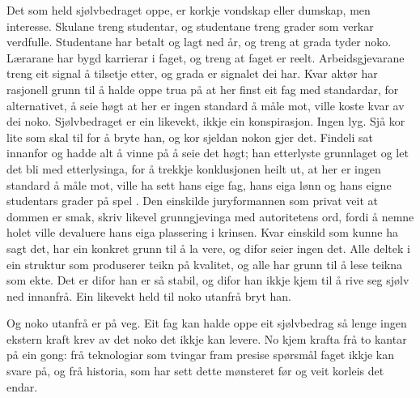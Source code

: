 Det som held sjølvbedraget oppe, er korkje vondskap eller dumskap, men interesse. Skulane treng studentar, og studentane treng grader som verkar verdfulle. Studentane har betalt og lagt ned år, og treng at grada tyder noko. Lærarane har bygd karrierar i faget, og treng at faget er reelt. Arbeidsgjevarane treng eit signal å tilsetje etter, og grada er signalet dei har. Kvar aktør har rasjonell grunn til å halde oppe trua på at her finst eit fag med standardar, for alternativet, å seie høgt at her er ingen standard å måle mot, ville koste kvar av dei noko. Sjølvbedraget er ein likevekt, ikkje ein konspirasjon. Ingen lyg. Sjå kor lite som skal til for å bryte han, og kor sjeldan nokon gjer det. Findeli sat innanfor og hadde alt å vinne på å seie det høgt; han etterlyste grunnlaget og let det bli med etterlysinga, for å trekkje konklusjonen heilt ut, at her er ingen standard å måle mot, ville ha sett hans eige fag, hans eiga lønn og hans eigne studentars grader på spel \autocite{findeli2001}. Den einskilde juryformannen som privat veit at dommen er smak, skriv likevel grunngjevinga med autoritetens ord, fordi å nemne holet ville devaluere hans eiga plassering i krinsen. Kvar einskild som kunne ha sagt det, har ein konkret grunn til å la vere, og difor seier ingen det. Alle deltek i ein struktur som produserer teikn på kvalitet, og alle har grunn til å lese teikna som ekte. Det er difor han er så stabil, og difor han ikkje kjem til å rive seg sjølv ned innanfrå. Ein likevekt held til noko utanfrå bryt han.

\vignett

Og noko utanfrå er på veg. Eit fag kan halde oppe eit sjølvbedrag så lenge ingen ekstern kraft krev av det noko det ikkje kan levere. No kjem krafta frå to kantar på ein gong: frå teknologiar som tvingar fram presise spørsmål faget ikkje kan svare på, og frå historia, som har sett dette mønsteret før og veit korleis det endar.


